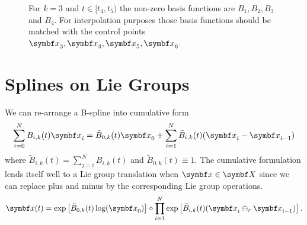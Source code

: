 \begin{figure}[h]
  \begin{center}
    \footnotesize
  \end{center}
  \caption{For $k=3$ and $t \in [t_4, t_5)$ the non-zero basis functions are $B_1, B_2, B_3$ and $B_4$. For interpolation purposes those basis functions should be matched with the control points $\x_{3}, \x_4, \x_5, \x_6$.}
  \label{fig:bspline_nonzero}
\end{figure}


\section{Splines on Lie Groups}

We can re-arrange a B-spline into cumulative form
\begin{equation}
  \sum_{i=0}^N B_{i, k}(t) \x_i = \tilde B_{0, k}(t) \x_0 + \sum_{i=1}^N \tilde B_{i, k}(t) (\x_i - \x_{i-1})
\end{equation}
where $\tilde B_{i, k}(t) = \sum_{j = i}^N B_{i, k}(t)$ and $\tilde B_{0, k}(t) \equiv 1$.
The cumulative formulation lends itself well to a Lie group translation when $\x \in \X$ since we can replace plus and minus by the corresponding Lie group operations.
\begin{equation}
  \label{eq:full_lie_spline}
  \x(t) = \exp \left[ \tilde B_{0, k}(t) \log (\x_0) \right] \circ \prod_{i=1}^N \exp \left[ \tilde B_{i, k} (t) (\x_i \ominus_r \x_{i-1}) \right].
\end{equation}

